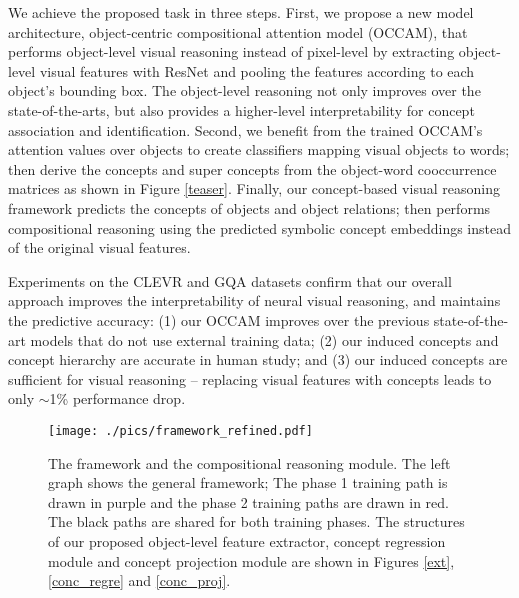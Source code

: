 \documentclass[10pt,twocolumn,letterpaper]{article}
\begin{document}
We achieve the proposed task in three steps.
First, we propose a new model architecture, object-centric compositional attention model (OCCAM), that performs object-level visual reasoning instead of pixel-level by extracting object-level visual features with ResNet \cite{He_2016_CVPR} and pooling the features according to each object's bounding box.
The object-level reasoning not only improves over the state-of-the-arts, but also provides a higher-level interpretability for concept association and identification.
Second, we benefit from the trained OCCAM's attention values over objects to create classifiers mapping visual objects to words; then derive the concepts and super concepts from the object-word cooccurrence matrices as shown in Figure \ref{teaser}.
Finally, our concept-based visual reasoning framework predicts the concepts of objects and object relations; then performs compositional reasoning using the predicted symbolic concept embeddings instead of the original visual features.






Experiments on the CLEVR and GQA datasets confirm that our overall approach improves the interpretability of neural visual reasoning, and maintains the predictive accuracy: (1) our OCCAM improves over the previous state-of-the-art models that do not use external training data; (2) our induced concepts and concept hierarchy are accurate in human study; and (3) our induced concepts are sufficient for visual reasoning -- replacing visual features with concepts leads to only $\sim$1\% performance drop.


\begin{figure*}[t]
\centering
\texttt{[image: ./pics/framework\_refined.pdf]}
\caption{\small{The framework and the compositional reasoning module. The left graph shows the general framework; The phase 1 training path is drawn in purple and the phase 2 training paths are drawn in red. The black paths are shared for both training phases. The structures of our proposed object-level feature extractor, concept regression module and concept projection module are shown in Figures \ref{ext}, \ref{conc_regre} and \ref{conc_proj}.}}
\label{framework}
\vspace{-3mm}
\end{figure*}

\vspace{-3mm}
\end{document}
